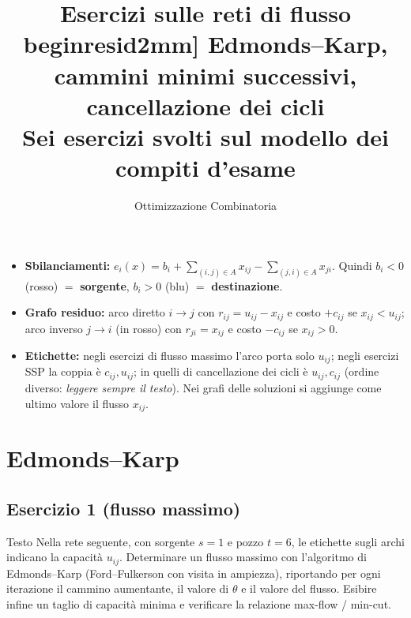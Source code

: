 \documentclass[11pt,a4paper]{article}
\title{\textbf{Esercizi sulle reti di flusso}\\begin{resid}2mm]
\large Edmonds--Karp, cammini minimi successivi, cancellazione dei cicli\\[1mm]
\normalsize Sei esercizi svolti sul modello dei compiti d'esame}
\author{Ottimizzazione Combinatoria}
\date{}
\begin{document}
\maketitle

\begin{tcolorbox}[colback=hl!12,colframe=hl!70!black,title=\textbf{Convenzioni usate (le stesse della guida allo svolgimento)}]
\begin{itemize}[nosep]
  \item \textbf{Sbilanciamenti:} $\displaystyle e_i(x)=b_i+\!\!\sum_{(i,j)\in A}\!\! x_{ij}-\!\!\sum_{(j,i)\in A}\!\! x_{ji}$.
        Quindi $b_i<0$ (\textcolor{neg}{rosso}) $=$ \textbf{sorgente}, $b_i>0$ (\textcolor{pos}{blu}) $=$ \textbf{destinazione}.
  \item \textbf{Grafo residuo:} arco diretto $i\to j$ con $r_{ij}=u_{ij}-x_{ij}$ e costo $+c_{ij}$ se $x_{ij}<u_{ij}$;
        arco inverso $j\to i$ (in \textcolor{neg}{rosso}) con $r_{ji}=x_{ij}$ e costo $-c_{ij}$ se $x_{ij}>0$.
  \item \textbf{Etichette:} negli esercizi di flusso massimo l'arco porta solo $u_{ij}$;
        negli esercizi SSP la coppia è $c_{ij},u_{ij}$; in quelli di cancellazione dei cicli è
        $u_{ij},c_{ij}$ (ordine diverso: \emph{leggere sempre il testo}). Nei grafi delle soluzioni
        si aggiunge come ultimo valore il flusso $x_{ij}$.
\end{itemize}
\end{tcolorbox}

\tableofcontents
\newpage

\section{Edmonds--Karp}

\subsection{Esercizio 1 (flusso massimo)}

\begin{testo}{Testo}
Nella rete seguente, con sorgente $s=1$ e pozzo $t=6$, le etichette sugli archi indicano la
capacità $u_{ij}$. Determinare un flusso massimo con l'algoritmo di Edmonds--Karp
(Ford--Fulkerson con visita in ampiezza), riportando per ogni iterazione il cammino aumentante,
il valore di $\theta$ e il valore del flusso. Esibire infine un taglio di capacità minima e
verificare la relazione max-flow / min-cut.
\end{testo}
\end{document}

